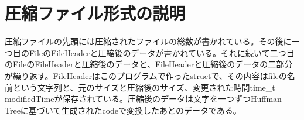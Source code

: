 \section{圧縮ファイル形式の説明}
圧縮ファイルの先頭には圧縮されたファイルの総数が書かれている。その後に一つ目のFileのFileHeaderと圧縮後のデータが書かれている。それに続いて二つ目のFileのFileHeaderと圧縮後のデータと、FileHeaderと圧縮後のデータの二部分が繰り返す。FileHeaderはこのプログラムで作ったstructで、その内容はfileの名前という文字列と、元のサイズと圧縮後のサイズ、変更された時間time\_t modifiedTimeが保存されている。圧縮後のデータは文字を一つずつHuffman Treeに基づいて生成されたcodeで変換したあとのデータである。